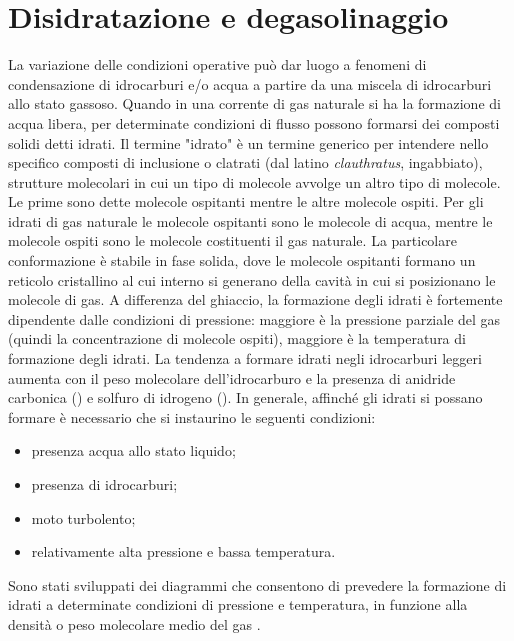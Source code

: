 \section{Disidratazione e degasolinaggio} \label{section:dehidratation}
La variazione delle condizioni operative può dar luogo a fenomeni di condensazione di idrocarburi e/o acqua a partire da una miscela di idrocarburi allo stato gassoso. Quando in una corrente di gas naturale si ha la formazione di acqua libera, per determinate condizioni di flusso possono formarsi dei composti solidi detti idrati.
Il termine "idrato" è un termine generico per intendere nello specifico composti di inclusione o clatrati (dal latino \textit{clauthratus}, ingabbiato), strutture molecolari in cui un tipo di molecole avvolge un altro tipo di molecole. Le prime sono dette molecole ospitanti mentre le altre molecole ospiti. Per gli idrati di gas naturale le molecole ospitanti sono le molecole di acqua, mentre le molecole ospiti sono le molecole costituenti il gas naturale. La particolare conformazione è stabile in fase solida, dove le molecole ospitanti formano un reticolo cristallino al cui interno si generano della cavità in cui si posizionano le molecole di gas. 
A differenza del ghiaccio, la formazione degli idrati è fortemente dipendente dalle condizioni di pressione: maggiore è la pressione parziale del gas (quindi la concentrazione di molecole ospiti), maggiore è la temperatura di formazione degli idrati. La tendenza a formare idrati negli idrocarburi leggeri aumenta con il peso molecolare dell'idrocarburo e la presenza di anidride carbonica () e solfuro di idrogeno (). 
In generale, affinché gli idrati si possano formare è necessario che si instaurino le seguenti condizioni:
\begin{itemize}
    \item presenza acqua allo stato liquido;
    \item presenza di idrocarburi;
    \item moto turbolento;
    \item relativamente alta pressione e bassa temperatura.
\end{itemize}
Sono stati sviluppati dei diagrammi che consentono di prevedere la formazione di idrati a determinate condizioni di pressione e temperatura, in funzione alla densità o peso molecolare medio del gas .
